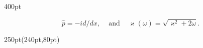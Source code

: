 \begin{frame}
\begin{textblock*}{400pt}
\begin{itemize}
\begin{equation}
  \hat{p} = -id/dx,\hspace{10pt} \mbox{ and } 
  \hspace{10pt} \varkappa(\omega) = \sqrt{\varkappa^2 + 2\omega}.
\end{equation}
\end{itemize}



\end{textblock*}

\begin{textblock*}{250pt}(240pt,80pt)
\end{textblock*}

\end{frame}


